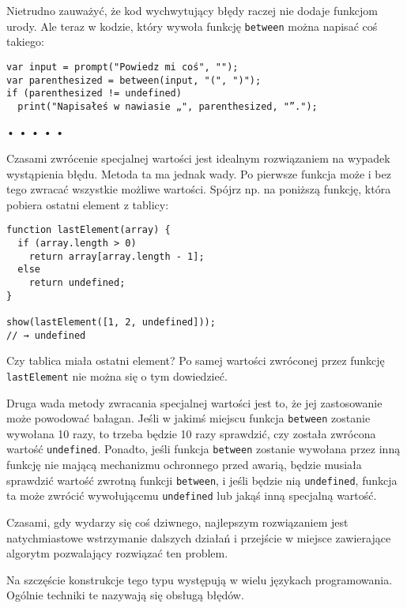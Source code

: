 Nietrudno zauważyć, że kod wychwytujący błędy raczej nie dodaje funkcjom urody. Ale teraz w kodzie, który wywoła funkcję \texttt{between} można napisać coś takiego:

  
\begin{verbatim} 
var input = prompt("Powiedz mi coś", "");
var parenthesized = between(input, "(", ")");
if (parenthesized != undefined)
  print("Napisałeś w nawiasie „", parenthesized, "”.");
 \end{verbatim}


\begin{center}
• • • • •
\end{center}

  
Czasami zwrócenie specjalnej wartości jest idealnym rozwiązaniem na wypadek wystąpienia błędu. Metoda ta ma jednak wady. Po pierwsze funkcja może i bez tego zwracać wszystkie możliwe wartości. Spójrz np. na poniższą funkcję, która pobiera ostatni element z tablicy:

  
\begin{verbatim} 
function lastElement(array) {
  if (array.length > 0)
    return array[array.length - 1];
  else
    return undefined;
}

show(lastElement([1, 2, undefined]));
// → undefined
\end{verbatim}
  
Czy tablica miała ostatni element? Po samej wartości zwróconej przez funkcję \texttt{lastElement} nie można się o tym dowiedzieć.

  
Druga wada metody zwracania specjalnej wartości jest to, że jej zastosowanie może powodować bałagan. Jeśli w jakimś miejscu funkcja \texttt{between} zostanie wywołana 10 razy, to trzeba będzie 10 razy sprawdzić, czy została zwrócona wartość \texttt{undefined}. Ponadto, jeśli funkcja \texttt{between} zostanie wywołana przez inną funkcję nie mającą mechanizmu ochronnego przed awarią, będzie musiała sprawdzić wartość zwrotną funkcji \texttt{between}, i jeśli będzie nią \texttt{undefined}, funkcja ta może zwrócić wywołującemu \texttt{undefined} lub jakąś inną specjalną wartość.

  
Czasami, gdy wydarzy się coś dziwnego, najlepszym rozwiązaniem jest natychmiastowe wstrzymanie dalszych działań i przejście w miejsce zawierające algorytm pozwalający rozwiązać ten problem.

  
Na szczęście konstrukcje tego typu występują w wielu językach programowania. Ogólnie techniki te nazywają się obsługą błędów.



